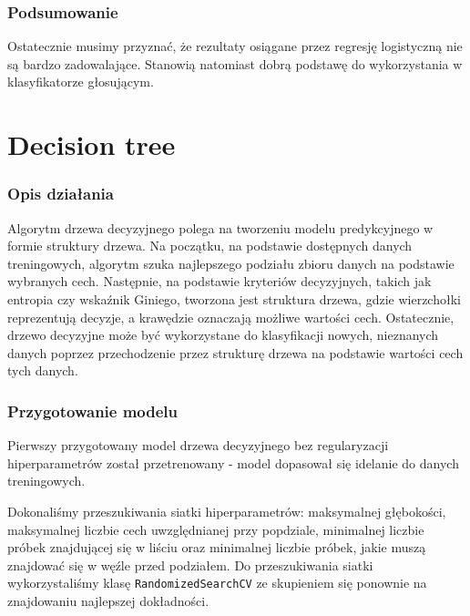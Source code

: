 \documentclass[11pt]{article}
\begin{document}
\hypertarget{podsumowanie}{%
\subsubsection{Podsumowanie}\label{podsumowanie}}

Ostatecznie musimy przyznać, że rezultaty osiągane przez regresję
logistyczną nie są bardzo zadowalające. Stanowią natomiast dobrą
podstawę do wykorzystania w klasyfikatorze głosującym.

    \hypertarget{decision-tree}{%
\section{Decision tree}\label{decision-tree}}

\hypertarget{opis-dziaux142ania}{%
\subsubsection{Opis działania}\label{opis-dziaux142ania}}

Algorytm drzewa decyzyjnego polega na tworzeniu modelu predykcyjnego w
formie struktury drzewa. Na początku, na podstawie dostępnych danych
treningowych, algorytm szuka najlepszego podziału zbioru danych na
podstawie wybranych cech. Następnie, na podstawie kryteriów decyzyjnych,
takich jak entropia czy wskaźnik Giniego, tworzona jest struktura
drzewa, gdzie wierzchołki reprezentują decyzje, a krawędzie oznaczają
możliwe wartości cech. Ostatecznie, drzewo decyzyjne może być
wykorzystane do klasyfikacji nowych, nieznanych danych poprzez
przechodzenie przez strukturę drzewa na podstawie wartości cech tych
danych.

\hypertarget{przygotowanie-modelu}{%
\subsubsection{Przygotowanie modelu}\label{przygotowanie-modelu}}

Pierwszy przygotowany model drzewa decyzyjnego bez regularyzacji
hiperparametrów został przetrenowany - model dopasował się idelanie do
danych treningowych.

Dokonaliśmy przeszukiwania siatki hiperparametrów: maksymalnej
głębokości, maksymalnej liczbie cech uwzględnianej przy popdziale,
minimalnej liczbie próbek znajdującej się w liściu oraz minimalnej
liczbie próbek, jakie muszą znajdować się w węźle przed podziałem. Do
przeszukiwania siatki wykorzystaliśmy klasę \texttt{RandomizedSearchCV}
ze skupieniem się ponownie na znajdowaniu najlepszej dokładności.
\end{document}
